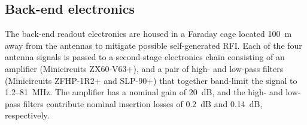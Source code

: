 \documentclass{ws-jai}
\begin{document}


\subsection{Back-end electronics}

The back-end readout electronics are housed in a Faraday cage located
100~m away from the antennas to mitigate possible self-generated RFI.
Each of the four antenna signals is passed to a second-stage
electronics chain consisting of an amplifier (Minicircuits ZX60-V63+),
and a pair of high- and low-pass filters (Minicircuits ZFHP-1R2+ and
SLP-90+) that together band-limit the signal to 1.2--\SI{81}{MHz}.
The amplifier has a nominal gain of 20~dB, and the high- and low-pass
filters contribute nominal insertion losses of 0.2~dB and 0.14~dB,
respectively.
\end{document}
